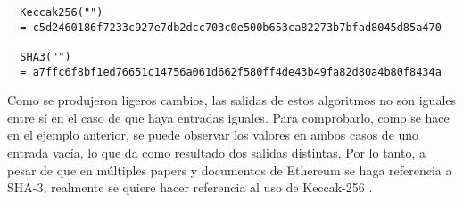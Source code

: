     \begin{verbatim}
  Keccak256("")
  = c5d2460186f7233c927e7db2dcc703c0e500b653ca82273b7bfad8045d85a470

  SHA3("")
  = a7ffc6f8bf1ed76651c14756a061d662f580ff4de43b49fa82d80a4b80f8434a
    \end{verbatim}

    Como se produjeron ligeros cambios, las salidas de estos algoritmos no son iguales
    entre sí en el caso de que haya entradas iguales. Para comprobarlo, como se hace en
    el ejemplo anterior, se puede observar los valores en ambos casos de uno entrada vacía, lo
    que da como resultado dos salidas distintas. Por lo tanto, a pesar de que en múltiples
    papers y documentos de Ethereum se haga referencia a SHA-3, realmente se quiere
    hacer referencia al uso de Keccak-256 \parencite{taibo2022}.

